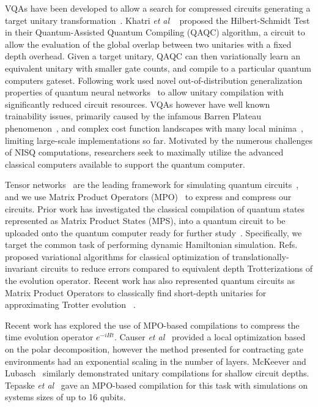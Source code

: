 \documentclass[a4paper,twocolumn,11pt,accepted=2025-06-10]{quantumarticle}
\begin{document}
VQAs have been developed to allow a search for compressed circuits generating a target unitary transformation~\cite{berthusen2022quantum, mizuta2022local, bilkis2021semi}. Khatri \emph{et al} ~\cite{khatri2019quantum} proposed the Hilbert-Schmidt Test in their Quantum-Assisted Quantum Compiling (QAQC) algorithm, a circuit to allow the evaluation of the global overlap between two unitaries with a fixed depth overhead. Given a target unitary, QAQC can then variationally learn an equivalent unitary with smaller gate counts, and compile to a particular quantum computers gateset. Following work used novel out-of-distribution generalization properties of quantum neural networks~\cite{caro2021generalization, caro2022outofdistribution,gibbs2024dynamical} to allow unitary compilation with significantly reduced circuit resources. VQAs however have well known trainability issues, primarily caused by the infamous Barren Plateau phenomenon~\cite{mcclean2018barren, larocca2024review}, and complex cost function landscapes with many local minima~\cite{anschuetz2022quantum}, limiting large-scale implementations so far. Motivated by the numerous challenges of NISQ computations, researchers seek to maximally utilize the advanced classical computers available to support the quantum computer. 

Tensor networks~\cite{orus2014practical} are the leading framework for simulating quantum circuits~\cite{pan2022simulation, tindall2023efficient}, and we use Matrix Product Operators (MPO)~\cite{mcculloch2007density} to express and compress our circuits. Prior work has investigated the classical compilation of quantum states represented as Matrix Product States (MPS), into a quantum circuit to be uploaded onto the quantum computer ready for further study~\cite{rudolph2022decomposition, rudolph2022synergy, dborin2022matrix, jamet2023anderson, rogerson2024quantum, anselme2024combining, lin2021real, robertson2024tensor}.
Specifically, we target the common task of performing dynamic Hamiltonian simulation. Refs.~\cite{mansuroglu2023variational, kotil2024riemannian} proposed variational algorithms for classical optimization of translationally-invariant circuits to reduce errors compared to equivalent depth Trotterizations of the evolution operator.
Recent work has also represented quantum circuits as Matrix Product Operators to classically find short-depth unitaries for approximating Trotter evolution~\cite{causer2023scalable,mc2023classically, robertson2024tensor,anselme2024combining} . 

Recent work has explored the use of MPO-based compilations to compress the time evolution operator $e^{-iHt}$. Causer \emph{et al}~\cite{causer2023scalable} provided a local optimization based on the polar decomposition, however the method presented for contracting gate environments had an exponential scaling in the number of layers. McKeever and Lubasch~\cite{mc2023classically,mc2024towards} similarly demonstrated unitary compilations for shallow circuit depths. Tepaske \emph{et al}~\cite{tepaske2023optimal,tepaske2024optimal} gave an MPO-based compilation for this task with simulations on systems sizes of up to 16 qubits.
\end{document}
